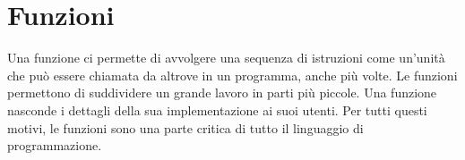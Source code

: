 \documentclass[../thesis.tex]{subfiles}
\begin{document}
    \newpage


    \section{Funzioni}\label{sec:funzioni}
    Una funzione ci permette di avvolgere una sequenza di istruzioni come un'unità che può essere chiamata da altrove in un programma, anche più volte.
    Le funzioni permettono di suddividere un grande lavoro in parti più piccole.
    Una funzione nasconde i dettagli della sua implementazione ai suoi utenti.
    Per tutti questi motivi, le funzioni sono una parte critica di tutto il linguaggio di programmazione.
    
    
    
    
    
    
    
    
    \clearpage
\end{document}
